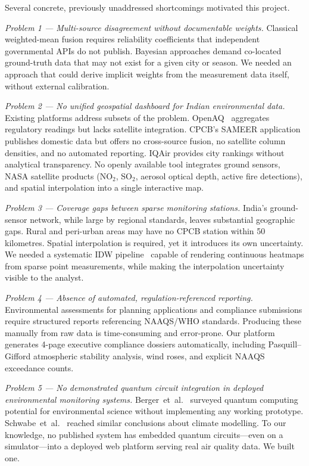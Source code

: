 \documentclass[conference]{IEEEtran}
\begin{document}
Several concrete, previously unaddressed shortcomings motivated this project.

\textit{Problem 1 --- Multi-source disagreement without documentable weights.}
Classical weighted-mean fusion requires reliability coefficients that
independent governmental APIs do not publish.
Bayesian approaches demand co-located ground-truth data that may not exist
for a given city or season.
We needed an approach that could derive implicit weights from the measurement
data itself, without external calibration.

\textit{Problem 2 --- No unified geospatial dashboard for Indian environmental data.}
Existing platforms address subsets of the problem.
OpenAQ~\cite{openaq2016} aggregates regulatory readings but lacks satellite
integration.
CPCB's SAMEER application publishes domestic data but offers no cross-source
fusion, no satellite column densities, and no automated reporting.
IQAir provides city rankings without analytical transparency.
No openly available tool integrates ground sensors, NASA satellite products
(NO$_2$, SO$_2$, aerosol optical depth, active fire detections), and
spatial interpolation into a single interactive map.

\textit{Problem 3 --- Coverage gaps between sparse monitoring stations.}
India's ground-sensor network, while large by regional standards, leaves
substantial geographic gaps.
Rural and peri-urban areas may have no CPCB station within 50 kilometres.
Spatial interpolation is required, yet it introduces its own uncertainty.
We needed a systematic IDW pipeline~\cite{shepard1968two} capable of
rendering continuous heatmaps from sparse point measurements, while
making the interpolation uncertainty visible to the analyst.

\textit{Problem 4 --- Absence of automated, regulation-referenced reporting.}
Environmental assessments for planning applications and compliance
submissions require structured reports referencing NAAQS/WHO standards.
Producing these manually from raw data is time-consuming and error-prone.
Our platform generates 4-page executive compliance dossiers automatically, including
Pasquill--Gifford atmospheric stability analysis, wind roses, and explicit
NAAQS exceedance counts.

\textit{Problem 5 --- No demonstrated quantum circuit integration in deployed
environmental monitoring systems.}
Berger~et~al.~\cite{berger2021quantum} surveyed quantum computing potential
for environmental science without implementing any working prototype.
Schwabe~et~al.~\cite{schwabe2025opportunities} reached similar conclusions
about climate modelling.
To our knowledge, no published system has embedded quantum circuits---even
on a simulator---into a deployed web platform serving real air quality data.
We built one.
\end{document}
